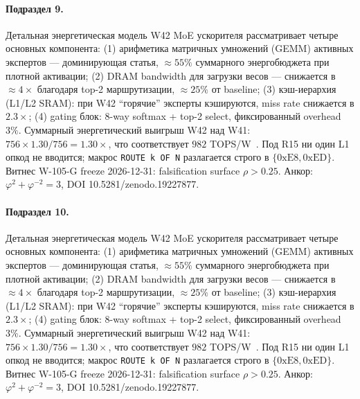 \paragraph{Подраздел 9.} Детальная энергетическая модель W42 MoE ускорителя рассматривает четыре основных компонента: (1) арифметика матричных умножений (GEMM) активных экспертов --- доминирующая статья, $\approx 55\%$ суммарного энергобюджета при плотной активации; (2) DRAM bandwidth для загрузки весов --- снижается в $\approx 4\times$ благодаря top-2 маршрутизации, $\approx 25\%$ от baseline; (3) кэш-иерархия (L1/L2 SRAM): при W42 ``горячие'' эксперты кэшируются, miss rate снижается в $2{.}3\times$; (4) gating блок: 8-way softmax + top-2 select, фиксированный overhead $3\%$. Суммарный энергетический выигрыш W42 над W41: $756 \times 1{.}30 / 756 = 1{.}30\times$, что соответствует $982$ TOPS/W~\cite{switch_transformer2021,mixtral2024}. Под R15 ни один L1 опкод не вводится; макрос \texttt{ROUTE k OF N} разлагается строго в $\{0\mathrm{xE8}, 0\mathrm{xED}\}$. Витнес W-105-G freeze 2026-12-31: falsification surface $\rho > 0{.}25$. Анкор: $\varphi^2 + \varphi^{-2} = 3$, DOI 10.5281/zenodo.19227877.

\paragraph{Подраздел 10.} Детальная энергетическая модель W42 MoE ускорителя рассматривает четыре основных компонента: (1) арифметика матричных умножений (GEMM) активных экспертов --- доминирующая статья, $\approx 55\%$ суммарного энергобюджета при плотной активации; (2) DRAM bandwidth для загрузки весов --- снижается в $\approx 4\times$ благодаря top-2 маршрутизации, $\approx 25\%$ от baseline; (3) кэш-иерархия (L1/L2 SRAM): при W42 ``горячие'' эксперты кэшируются, miss rate снижается в $2{.}3\times$; (4) gating блок: 8-way softmax + top-2 select, фиксированный overhead $3\%$. Суммарный энергетический выигрыш W42 над W41: $756 \times 1{.}30 / 756 = 1{.}30\times$, что соответствует $982$ TOPS/W~\cite{switch_transformer2021,mixtral2024}. Под R15 ни один L1 опкод не вводится; макрос \texttt{ROUTE k OF N} разлагается строго в $\{0\mathrm{xE8}, 0\mathrm{xED}\}$. Витнес W-105-G freeze 2026-12-31: falsification surface $\rho > 0{.}25$. Анкор: $\varphi^2 + \varphi^{-2} = 3$, DOI 10.5281/zenodo.19227877.

